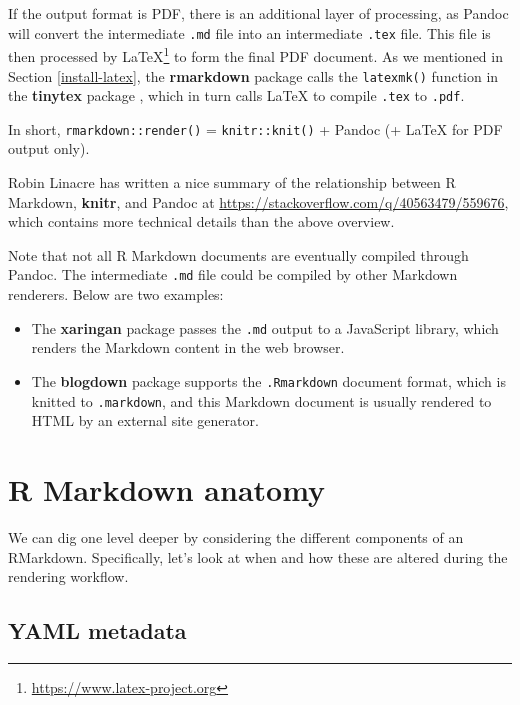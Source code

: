 \documentclass[
  11pt,
]{krantz}
\renewcommand{\href}[2]{#2\footnote{\url{#1}}}
\begin{document}
If the output format is PDF, there is an additional layer of processing, as Pandoc will convert the intermediate \texttt{.md} file into an intermediate \texttt{.tex} file. This file is then processed by \href{https://www.latex-project.org}{LaTeX} to form the final PDF document. As we mentioned in Section \ref{install-latex}, the \textbf{rmarkdown} package calls the \texttt{latexmk()} function in the \textbf{tinytex} package \citep{R-tinytex}, which in turn calls LaTeX to compile \texttt{.tex} to \texttt{.pdf}.

In short, \texttt{rmarkdown::render()} = \texttt{knitr::knit()} + Pandoc (+ LaTeX for PDF output only).

Robin Linacre has written a nice summary of the relationship between R Markdown, \textbf{knitr}, and Pandoc at \url{https://stackoverflow.com/q/40563479/559676}, which contains more technical details than the above overview.

Note that not all R Markdown documents are eventually compiled through Pandoc. The intermediate \texttt{.md} file could be compiled by other Markdown renderers. Below are two examples:

\begin{itemize}
\item
  The \textbf{xaringan} package \citep{R-xaringan} passes the \texttt{.md} output to a JavaScript library, which renders the Markdown content in the web browser.
\item
  The \textbf{blogdown} package \citep{R-blogdown} supports the \texttt{.Rmarkdown} document format, which is knitted to \texttt{.markdown}, and this Markdown document is usually rendered to HTML by an external site generator.
\end{itemize}

\hypertarget{rmarkdown-anatomy}{%
\section{R Markdown anatomy}\label{rmarkdown-anatomy}}

We can dig one level deeper by considering the different components of an RMarkdown. Specifically, let's look at when and how these are altered during the rendering workflow.

\hypertarget{yaml-metadata}{%
\subsection{YAML metadata}\label{yaml-metadata}}
\end{document}
